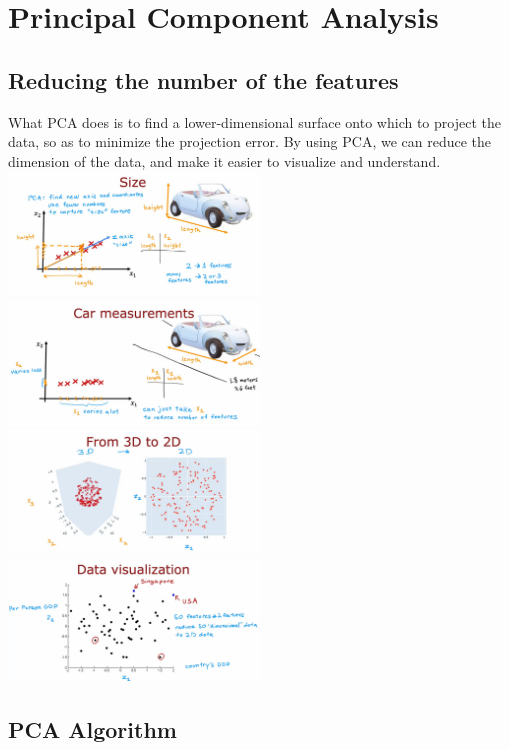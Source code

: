 \chapter{Principal Component Analysis}
\section{Reducing the number of the features}
What PCA does is to find a lower-dimensional surface onto which to project the data,
so as to minimize the projection error.
By using PCA, we can reduce the dimension of the data, and make it easier to visualize and understand.\\
\includegraphics*[width=0.5\textwidth]{images/pca1}
\includegraphics*[width=0.5\textwidth]{images/pca2}
\vspace{2em}
\includegraphics*[width=0.5\textwidth]{images/pca3}
\includegraphics*[width=0.5\textwidth]{images/pca4}

\section{PCA Algorithm}
